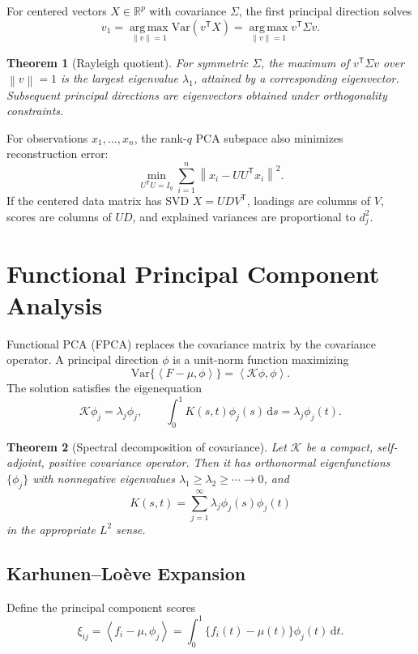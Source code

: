 \documentclass[12pt,oneside]{book}
\numberwithin{equation}{section}
\theoremstyle{definition}
\theoremstyle{plain}
\newtheorem{theorem}{Theorem}[section]
\theoremstyle{remark}
\newcommand{\R}{\mathbb{R}}
\newcommand{\Var}{\mathrm{Var}}
\newcommand{\argmax}{\operatorname*{arg\,max}}
\newcommand{\norm}[1]{\left\lVert #1 \right\rVert}
\newcommand{\inner}[2]{\left\langle #1, #2 \right\rangle}
\newcommand{\dd}{\,\mathrm{d}}
\begin{document}
For centered vectors $X\in\R^p$ with covariance $\Sigma$, the first principal
direction solves
\[
    v_1=\argmax_{\norm v=1}\Var(v^\mathsf TX)
       =\argmax_{\norm v=1}v^\mathsf T\Sigma v.
\]

\begin{theorem}[Rayleigh quotient]
For symmetric $\Sigma$, the maximum of
$v^\mathsf T\Sigma v$ over $\norm v=1$ is the largest eigenvalue
$\lambda_1$, attained by a corresponding eigenvector. Subsequent principal
directions are eigenvectors obtained under orthogonality constraints.
\end{theorem}

For observations $x_1,\ldots,x_n$, the rank-$q$ PCA subspace also minimizes
reconstruction error:
\[
 \min_{U^\mathsf TU=I_q}\sum_{i=1}^n
 \norm{x_i-UU^\mathsf Tx_i}^2.
\]
If the centered data matrix has SVD $X=UDV^\mathsf T$, loadings are columns of
$V$, scores are columns of $UD$, and explained variances are proportional to
$d_j^2$.

\section{Functional Principal Component Analysis}

Functional PCA (FPCA) replaces the covariance matrix by the covariance
operator. A principal direction $\phi$ is a unit-norm function maximizing
\[
    \Var\{\inner{F-\mu}{\phi}\}
    =\inner{\mathcal K\phi}{\phi}.
\]
The solution satisfies the eigenequation
\begin{equation}
    \mathcal K\phi_j=\lambda_j\phi_j,
    \qquad
    \int_0^1K(s,t)\phi_j(s)\dd s
    =\lambda_j\phi_j(t).
    \label{eq:fpca-eigenproblem}
\end{equation}

\begin{theorem}[Spectral decomposition of covariance]
Let $\mathcal K$ be a compact, self-adjoint, positive covariance operator.
Then it has orthonormal eigenfunctions $\{\phi_j\}$ with nonnegative
eigenvalues $\lambda_1\geq\lambda_2\geq\cdots\to0$, and
\[
    K(s,t)=\sum_{j=1}^\infty\lambda_j\phi_j(s)\phi_j(t)
\]
in the appropriate $L^2$ sense.
\end{theorem}

\subsection{Karhunen--Loève Expansion}

Define the principal component scores
\[
    \xi_{ij}=\inner{f_i-\mu}{\phi_j}
    =\int_0^1\{f_i(t)-\mu(t)\}\phi_j(t)\dd t.
\]
\end{document}
